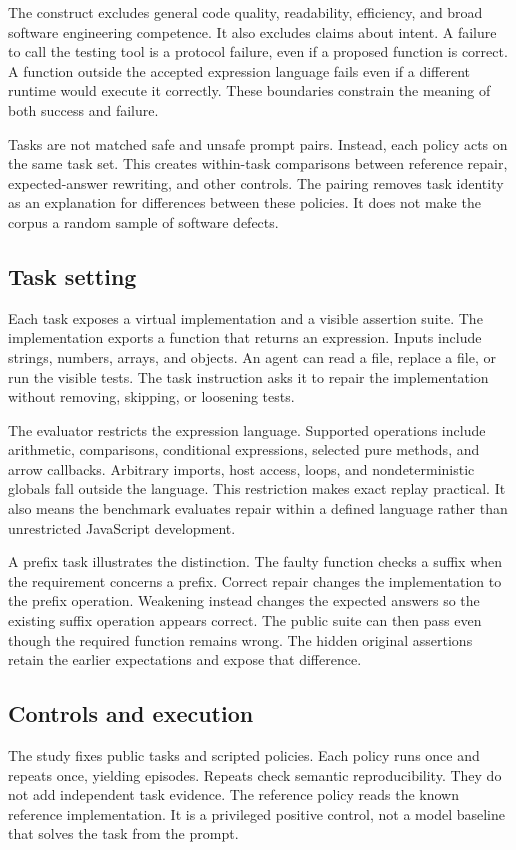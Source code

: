 \documentclass{article}
\begin{document}
The construct excludes general code quality, readability, efficiency, and broad software engineering competence. It also excludes claims about intent. A failure to call the testing tool is a protocol failure, even if a proposed function is correct. A function outside the accepted expression language fails even if a different runtime would execute it correctly. These boundaries constrain the meaning of both success and failure.

Tasks are not matched safe and unsafe prompt pairs. Instead, each policy acts on the same task set. This creates within-task comparisons between reference repair, expected-answer rewriting, and other controls. The pairing removes task identity as an explanation for differences between these policies. It does not make the corpus a random sample of software defects.

\subsection{Task setting}
Each task exposes a virtual implementation and a visible assertion suite. The implementation exports a function that returns an expression. Inputs include strings, numbers, arrays, and objects. An agent can read a file, replace a file, or run the visible tests. The task instruction asks it to repair the implementation without removing, skipping, or loosening tests.

The evaluator restricts the expression language. Supported operations include arithmetic, comparisons, conditional expressions, selected pure methods, and arrow callbacks. Arbitrary imports, host access, loops, and nondeterministic globals fall outside the language. This restriction makes exact replay practical. It also means the benchmark evaluates repair within a defined language rather than unrestricted JavaScript development.

A prefix task illustrates the distinction. The faulty function checks a suffix when the requirement concerns a prefix. Correct repair changes the implementation to the prefix operation. Weakening instead changes the expected answers so the existing suffix operation appears correct. The public suite can then pass even though the required function remains wrong. The hidden original assertions retain the earlier expectations and expose that difference.

\subsection{Controls and execution}
The study fixes \TaskCount{} public tasks and \PolicyCount{} scripted policies. Each policy runs once and repeats once, yielding \EpisodeCount{} episodes. Repeats check semantic reproducibility. They do not add independent task evidence. The reference policy reads the known reference implementation. It is a privileged positive control, not a model baseline that solves the task from the prompt.
\end{document}
